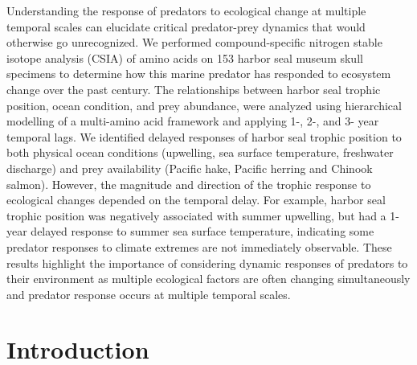\documentclass [11pt, proquest] {uwthesis}[2015/03/03]
\begin{document}
Understanding the response of predators to ecological change at multiple
temporal scales can elucidate critical predator-prey dynamics that would
otherwise go unrecognized. We performed compound-specific nitrogen
stable isotope analysis (CSIA) of amino acids on 153 harbor seal museum
skull specimens to determine how this marine predator has responded to
ecosystem change over the past century. The relationships between harbor
seal trophic position, ocean condition, and prey abundance, were
analyzed using hierarchical modelling of a multi-amino acid framework
and applying 1-, 2-, and 3- year temporal lags. We identified delayed
responses of harbor seal trophic position to both physical ocean
conditions (upwelling, sea surface temperature, freshwater discharge)
and prey availability (Pacific hake, Pacific herring and Chinook
salmon). However, the magnitude and direction of the trophic response to
ecological changes depended on the temporal delay. For example, harbor
seal trophic position was negatively associated with summer upwelling,
but had a 1- year delayed response to summer sea surface temperature,
indicating some predator responses to climate extremes are not
immediately observable. These results highlight the importance of
considering dynamic responses of predators to their environment as
multiple ecological factors are often changing simultaneously and
predator response occurs at multiple temporal scales.

\section{Introduction}\label{introduction-3}
\end{document}
